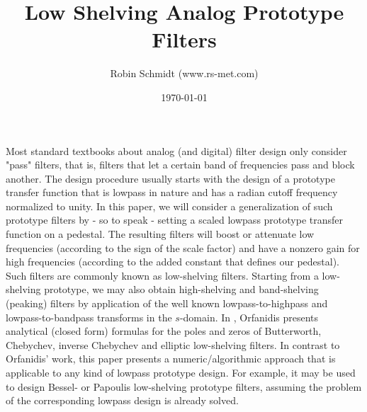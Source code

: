 \title{Low Shelving Analog Prototype Filters}
\author{Robin Schmidt (www.rs-met.com)}
\date{\today}
\maketitle

Most standard textbooks about analog (and digital) filter design only consider "pass" filters, that is, filters that let a certain band of frequencies pass and block another. The design procedure usually starts with the design of a prototype transfer function that is lowpass in nature and has a radian cutoff frequency normalized to unity. In this paper, we will consider a generalization of such prototype filters by - so to speak - setting a scaled lowpass prototype transfer function on a pedestal. The resulting filters will boost or attenuate low frequencies (according to the sign of the scale factor) and have a nonzero gain for high frequencies (according to the added constant that defines our pedestal). Such filters are commonly known as low-shelving filters. Starting from a low-shelving prototype, we may also obtain high-shelving and band-shelving (peaking) filters by application of the well known lowpass-to-highpass and lowpass-to-bandpass transforms in the $s$-domain. In \cite{Orf}, Orfanidis presents analytical (closed form) formulas for the poles and zeros of Butterworth, Chebychev, inverse Chebychev and elliptic low-shelving filters. In contrast to Orfanidis' work, this paper presents a numeric/algorithmic approach that is applicable to any kind of lowpass prototype design. For example, it may be used to design Bessel- or Papoulis low-shelving prototype filters, assuming the problem of the corresponding lowpass design is already solved.

